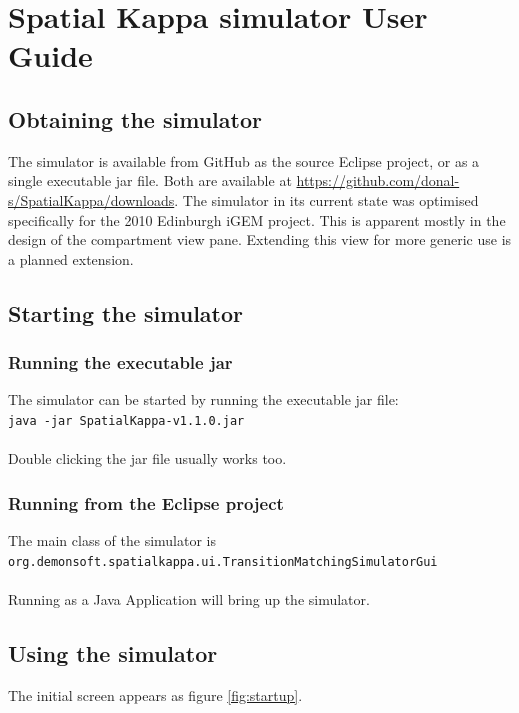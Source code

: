 \chapter{Spatial Kappa simulator User Guide}

\section{Obtaining the simulator}

The simulator is available from GitHub as the source Eclipse project, or as a single executable jar file. Both are available at \url{https://github.com/donal-s/SpatialKappa/downloads}. The simulator in its current state was optimised specifically for the 2010 Edinburgh iGEM project. This is apparent mostly in the design of the compartment view pane. Extending this view for more generic use is a planned extension.

\section{Starting the simulator}

\subsection{Running the executable jar}

The simulator can be started by running the executable jar file:\\
\verb|java -jar SpatialKappa-v1.1.0.jar|\\\\
Double clicking the jar file usually works too.

\subsection{Running from the Eclipse project}

The main class of the simulator is \\
\verb|org.demonsoft.spatialkappa.ui.TransitionMatchingSimulatorGui|\\\\
Running as a Java Application will bring up the simulator.


\section{Using the simulator}


The initial screen appears as figure \ref{fig:startup}.

